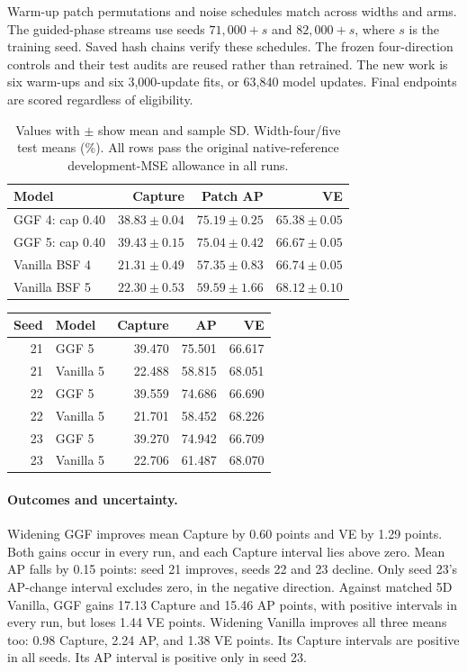 Warm-up patch permutations and noise schedules match across widths and
arms. The guided-phase streams use seeds $71{,}000+s$ and $82{,}000+s$,
where $s$ is the training seed. Saved hash chains verify these schedules.
The frozen four-direction controls and their test audits are reused rather
than retrained. The new work is six warm-ups and six 3,000-update fits,
or 63,840 model updates. Final endpoints are scored regardless of eligibility.

\begin{table}[t]\centering\small
\caption{Values with $\pm$ show mean and sample SD. Width-four/five test means (\%). All rows pass the original
native-reference development-MSE allowance in all runs.}
\label{tab:width5-means}
\begin{tabular}{@{}lrrr@{}}\hline
Model & Capture & Patch AP & VE\\\hline
GGF 4: cap 0.40 & $38.83\pm0.04$ & $75.19\pm0.25$ & $65.38\pm0.05$\\
GGF 5: cap 0.40 & $39.43\pm0.15$ & $75.04\pm0.42$ & $66.67\pm0.05$\\
Vanilla BSF 4 & $21.31\pm0.49$ & $57.35\pm0.83$ & $66.74\pm0.05$\\
Vanilla BSF 5 & $22.30\pm0.53$ & $59.59\pm1.66$ & $68.12\pm0.10$\\\hline
\end{tabular}\end{table}

\begin{agfresulttable}
\caption{All five-direction endpoints: test percentages.}
\label{tab:width5-seeds}
\begin{tabular}{@{}rlrrr@{}}\hline
Seed & Model & Capture & AP & VE\\\hline
21 & GGF 5 &39.470&75.501&66.617\\
21 & Vanilla 5 &22.488&58.815&68.051\\
22 & GGF 5 &39.559&74.686&66.690\\
22 & Vanilla 5 &21.701&58.452&68.226\\
23 & GGF 5 &39.270&74.942&66.709\\
23 & Vanilla 5 &22.706&61.487&68.070\\\hline
\end{tabular}\end{agfresulttable}

\paragraph{Outcomes and uncertainty.}
Widening GGF improves mean Capture by 0.60 points and VE by 1.29 points.
Both gains occur in every run, and each Capture interval lies above zero.
Mean AP falls by 0.15 points: seed 21 improves, seeds 22 and 23 decline.
Only seed 23's AP-change interval excludes zero, in the negative direction.
Against matched 5D Vanilla, GGF gains 17.13 Capture and 15.46 AP points,
with positive intervals in every run, but loses 1.44 VE points. Widening
Vanilla improves all three means too: 0.98 Capture, 2.24 AP, and 1.38 VE points.
Its Capture intervals are positive in all seeds. Its AP interval is positive
only in seed 23.

